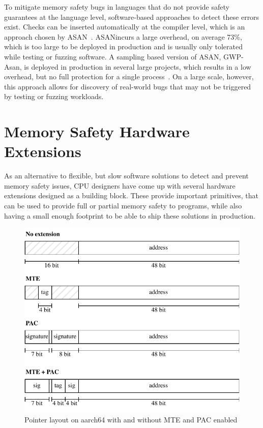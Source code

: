 To mitigate memory safety bugs in languages that do not provide safety guarantees at the language level, software-based approaches to detect these errors exist.
Checks can be inserted automatically at the compiler level, which is an approach chosen by \ac{ASAN}~\cite{serebryany2012addresssanitizer}.
\ac{ASAN}incurs a large overhead, on average 73\%, which is too large to be deployed in production and is usually only tolerated while testing or fuzzing software.
A sampling based version of \ac{ASAN}, GWP-Asan, is deployed in production in several large projects, which results in a low overhead, but no full protection for a single process~\cite{serebryany2023gwp}.
On a large scale, however, this approach allows for discovery of real-world bugs that may not be triggered by testing or fuzzing workloads.

\section{Memory Safety Hardware Extensions}
\label{sec:memory-safety-hardware-extensions}

As an alternative to flexible, but slow software solutions to detect and prevent memory safety issues, CPU designers have come up with several hardware extensions designed as a building block.
These provide important primitives, that can be used to provide full or partial memory safety to programs, while also having a small enough footprint to be able to ship these solutions in production.

\begin{figure}[t]
    \centering
    \includegraphics[scale=1]{figures/build/pointer-aarch64}
    \caption{Pointer layout on aarch64 with and without MTE and PAC enabled}
    \label{fig:aarch64-pointer}
\end{figure}

